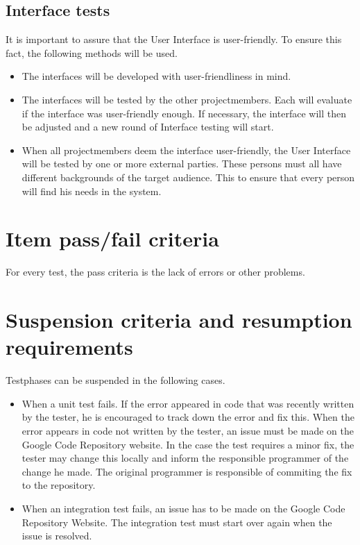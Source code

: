 \documentclass[salesmen, twoside]{../../../templates/latex/2009/softproj}
\begin{document}
\begin{projdoc}
\subsection{Interface tests}
It is important to assure that the User Interface is user-friendly. To ensure this fact, the following methods will be used.
\begin{itemize}
\item
The interfaces will be developed with user-friendliness in mind.
\item
The interfaces will be tested by the other projectmembers. Each will evaluate if the interface was user-friendly enough. If necessary, the interface will then be adjusted and a new round of Interface testing will start.
\item
When all projectmembers deem the interface user-friendly, the User Interface will be tested by one or more external parties. These persons must all have different backgrounds of the target audience. This to ensure that every person will find his needs in the system.
\end{itemize}

\section{Item pass/fail criteria}
For every test, the pass criteria is the lack of errors or other problems.

\section{Suspension criteria and resumption requirements}
Testphases can be suspended in the following cases.
\begin{itemize}
\item
When a unit test fails. If the error appeared in code that was recently written by the tester, he is encouraged to track down the error and fix this. When the error appears in code not written by the tester, an issue must be made on the Google Code Repository website\cite{googleSVN}. In the case the test requires a minor fix, the tester may change this locally and inform the responsible programmer of the change he made. The original programmer is responsible of commiting the fix to the repository.
\item
When an integration test fails, an issue has to be made on the Google Code Repository Website\cite{googleSVN}. The integration test must start over again when the issue is resolved.
\end{itemize}


\end{projdoc}
\end{document}
